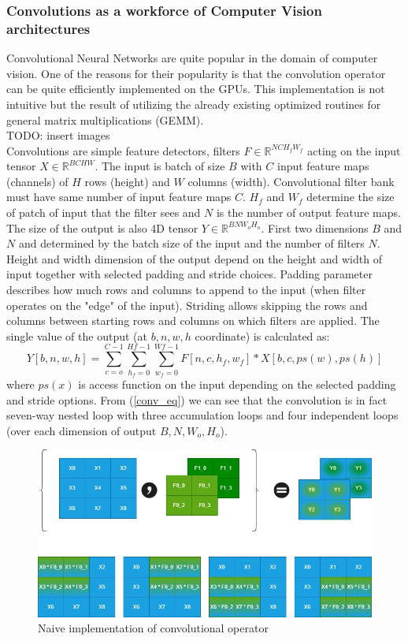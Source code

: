 \documentclass{article}
\begin{document}
\subsubsection{Convolutions as a workforce of Computer Vision architectures}
Convolutional Neural Networks  \cite{Lecun1998} are quite popular in the domain of computer vision. One of the reasons for their popularity is that the convolution operator can be quite efficiently implemented on the GPUs. This implementation is not intuitive but the result of utilizing the already existing optimized routines for general matrix multiplications (GEMM).\\
TODO: insert images\\
Convolutions are simple feature detectors, filters $F \in \mathbb{R}^{NCH_fW_f}$ acting on the input tensor $X \in \mathbb{R}^{BCHW}$. The input is batch of size $B$ with $C$ input feature maps (channels) of $H$ rows (height) and $W$ columns (width). Convolutional filter bank must have same number of input feature maps $C$. $H_f$ and $W_f$ determine the size of patch of input that the filter sees and $N$ is the number of output feature maps. The size of the output is also 4D tensor $Y \in \mathbb{R}^{BNW_oH_o}$.
First two dimensions $B$ and $N$ and determined by the batch size of the input and the number of filters $N$. Height and width dimension of the output depend on the height and width of input together with selected padding and stride choices. Padding parameter describes how much rows and columns to append to the input (when filter operates on the "edge" of the input). Striding allows skipping the rows and columns between starting rows and columns on which filters are applied. 
The single value of the output (at $b, n, w, h$ coordinate) is calculated as:
\begin{equation}
    Y[b,n,w,h] = \sum_{c=o}^{C-1}\sum_{h_f=0}^{Hf-1}\sum_{w_f=0}^{Wf-1} F[n,c,h_f,w_f] * X[b, c, ps(w), ps(h)]
\label{conv_eq}
\end{equation}
where $ps(x)$ is access function on the input depending on the selected padding and stride options.
From (\ref{conv_eq}) we can see that the convolution is in fact seven-way nested loop with three accumulation loops and four independent loops (over each dimension of output $B, N, W_o, H_o$).
\begin{figure}
    \centering
    \includegraphics[scale=0.4]{ConvDiagram_Naive.jpg}
    \caption{Naive implementation of convolutional operator}
    \label{fig:conv_naive}
\end{figure}
\end{document}
